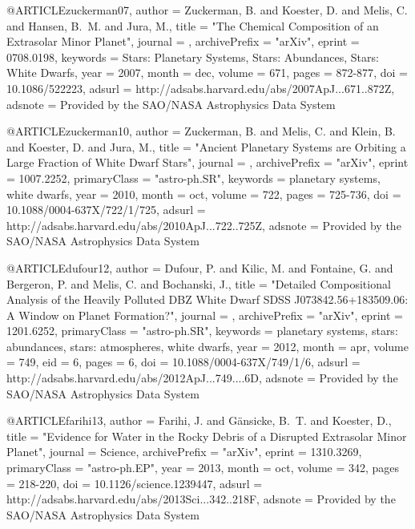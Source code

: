 \documentclass[a4paper,fleqn,usenatbib]{mnras}
\begin{document}
{{{{{@ARTICLE{zuckerman07,
   author = {{Zuckerman}, B. and {Koester}, D. and {Melis}, C. and {Hansen}, B.~M. and 
	{Jura}, M.},
    title = "{The Chemical Composition of an Extrasolar Minor Planet}",
  journal = {\apj},
archivePrefix = "arXiv",
   eprint = {0708.0198},
 keywords = {Stars: Planetary Systems, Stars: Abundances, Stars: White Dwarfs},
     year = 2007,
    month = dec,
   volume = 671,
    pages = {872-877},
      doi = {10.1086/522223},
   adsurl = {http://adsabs.harvard.edu/abs/2007ApJ...671..872Z},
  adsnote = {Provided by the SAO/NASA Astrophysics Data System}
}


@ARTICLE{zuckerman10,
   author = {{Zuckerman}, B. and {Melis}, C. and {Klein}, B. and {Koester}, D. and 
	{Jura}, M.},
    title = "{Ancient Planetary Systems are Orbiting a Large Fraction of White Dwarf Stars}",
  journal = {\apj},
archivePrefix = "arXiv",
   eprint = {1007.2252},
 primaryClass = "astro-ph.SR",
 keywords = {planetary systems, white dwarfs},
     year = 2010,
    month = oct,
   volume = 722,
    pages = {725-736},
      doi = {10.1088/0004-637X/722/1/725},
   adsurl = {http://adsabs.harvard.edu/abs/2010ApJ...722..725Z},
  adsnote = {Provided by the SAO/NASA Astrophysics Data System}
}


@ARTICLE{dufour12,
   author = {{Dufour}, P. and {Kilic}, M. and {Fontaine}, G. and {Bergeron}, P. and 
	{Melis}, C. and {Bochanski}, J.},
    title = "{Detailed Compositional Analysis of the Heavily Polluted DBZ White Dwarf SDSS J073842.56+183509.06: A Window on Planet Formation?}",
  journal = {\apj},
archivePrefix = "arXiv",
   eprint = {1201.6252},
 primaryClass = "astro-ph.SR",
 keywords = {planetary systems, stars: abundances, stars: atmospheres, white dwarfs},
     year = 2012,
    month = apr,
   volume = 749,
      eid = {6},
    pages = {6},
      doi = {10.1088/0004-637X/749/1/6},
   adsurl = {http://adsabs.harvard.edu/abs/2012ApJ...749....6D},
  adsnote = {Provided by the SAO/NASA Astrophysics Data System}
}


@ARTICLE{farihi13,
   author = {{Farihi}, J. and {G{\"a}nsicke}, B.~T. and {Koester}, D.},
    title = "{Evidence for Water in the Rocky Debris of a Disrupted Extrasolar Minor Planet}",
  journal = {Science},
archivePrefix = "arXiv",
   eprint = {1310.3269},
 primaryClass = "astro-ph.EP",
     year = 2013,
    month = oct,
   volume = 342,
    pages = {218-220},
      doi = {10.1126/science.1239447},
   adsurl = {http://adsabs.harvard.edu/abs/2013Sci...342..218F},
  adsnote = {Provided by the SAO/NASA Astrophysics Data System}
}

}}}}}
\end{document}
